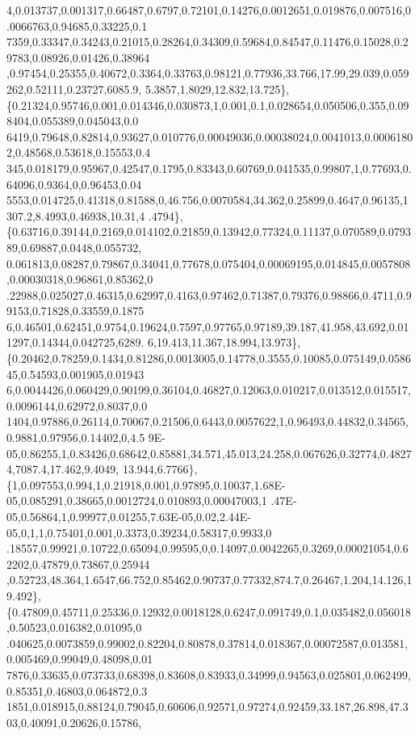 \begin{DoxyCode}
      4,0.013737,0.001317,0.66487,0.6797,0.72101,0.14276,0.0012651,0.019876,0.007516,0.0066763,0.94685,0.33225,0.1
      7359,0.33347,0.34243,0.21015,0.28264,0.34309,0.59684,0.84547,0.11476,0.15028,0.29783,0.08926,0.01426,0.38964
      ,0.97454,0.25355,0.40672,0.3364,0.33763,0.98121,0.77936,33.766,17.99,29.039,0.059262,0.52111,0.23727,6085.9,
      5.3857,1.8029,12.832,13.725\},
\{0.21324,0.95746,0.001,0.014346,0.030873,1,0.001,0.1,0.028654,0.050506,0.355,0.098404,0.055389,0.045043,0.0
      6419,0.79648,0.82814,0.93627,0.010776,0.00049036,0.00038024,0.0041013,0.00061802,0.48568,0.53618,0.15553,0.4
      345,0.018179,0.95967,0.42547,0.1795,0.83343,0.60769,0.041535,0.99807,1,0.77693,0.64096,0.9364,0,0.96453,0.04
      5553,0.014725,0.41318,0.81588,0,46.756,0.0070584,34.362,0.25899,0.4647,0.96135,1307.2,8.4993,0.46938,10.31,4
      .4794\},
\{0.63716,0.39144,0.2169,0.014102,0.21859,0.13942,0.77324,0.11137,0.070589,0.079389,0.69887,0.0448,0.055732,
      0.061813,0.08287,0.79867,0.34041,0.77678,0.075404,0.00069195,0.014845,0.0057808,0.00030318,0.96861,0.85362,0
      .22988,0.025027,0.46315,0.62997,0.4163,0.97462,0.71387,0.79376,0.98866,0.4711,0.99153,0.71828,0.33559,0.1875
      6,0.46501,0.62451,0.9754,0.19624,0.7597,0.97765,0.97189,39.187,41.958,43.692,0.011297,0.14344,0.042725,6289.
      6,19.413,11.367,18.994,13.973\},
\{0.20462,0.78259,0.1434,0.81286,0.0013005,0.14778,0.3555,0.10085,0.075149,0.058645,0.54593,0.001905,0.01943
      6,0.0044426,0.060429,0.90199,0.36104,0.46827,0.12063,0.010217,0.013512,0.015517,0.0096144,0.62972,0.8037,0.0
      1404,0.97886,0.26114,0.70067,0.21506,0.6443,0.0057622,1,0.96493,0.44832,0.34565,0.9881,0.97956,0.14402,0,4.5
      9E-05,0.86255,1,0.83426,0.68642,0.85881,34.571,45.013,24.258,0.067626,0.32774,0.48274,7087.4,17.462,9.4049,
      13.944,6.7766\},
\{1,0.097553,0.994,1,0.21918,0.001,0.97895,0.10037,1.68E-05,0.085291,0.38665,0.0012724,0.010893,0.00047003,1
      .47E-05,0.56864,1,0.99977,0.01255,7.63E-05,0.02,2.44E-05,0,1,1,0.75401,0.001,0.3373,0.39234,0.58317,0.9933,0
      .18557,0.99921,0.10722,0.65094,0.99595,0,0.14097,0.0042265,0.3269,0.00021054,0.62202,0.47879,0.73867,0.25944
      ,0.52723,48.364,1.6547,66.752,0.85462,0.90737,0.77332,874.7,0.26467,1.204,14.126,19.492\},
\{0.47809,0.45711,0.25336,0.12932,0.0018128,0.6247,0.091749,0.1,0.035482,0.056018,0.50523,0.016382,0.01095,0
      .040625,0.0073859,0.99002,0.82204,0.80878,0.37814,0.018367,0.00072587,0.013581,0.005469,0.99049,0.48098,0.01
      7876,0.33635,0.073733,0.68398,0.83608,0.83933,0.34999,0.94563,0.025801,0.062499,0.85351,0.46803,0.064872,0.3
      1851,0.018915,0.88124,0.79045,0.60606,0.92571,0.97274,0.92459,33.187,26.898,47.303,0.40091,0.20626,0.15786,

\end{DoxyCode}

